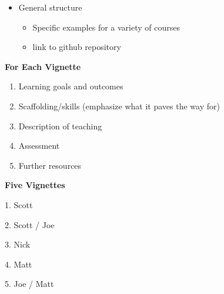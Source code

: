 \documentclass{article}
\begin{document}
\begin{itemize}
    \item General structure
    \begin{itemize}
        \item Specific examples for a variety of courses
        \item link to github repository
    \end{itemize}
\end{itemize}

\textbf{For Each Vignette}

\begin{enumerate}
\item
    Learning goals and outcomes
\item 
    Scaffolding/skills (emphasize what it paves the way for)
\item 
    Description of teaching 
\item 
    Assessment 
\item 
    Further resources 
\end{enumerate}

\textbf{Five Vignettes}

1. Scott

2. Scott / Joe

3. Nick

4. Matt 

5. Joe / Matt
\end{document}
